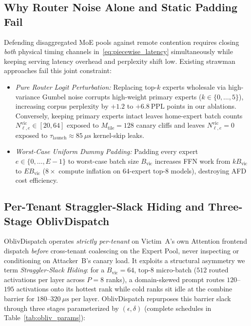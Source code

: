 \documentclass[final,5p,times,twocolumn]{elsarticle}
\def\OD{OblivDispatch}%
\theoremstyle{definition}
\theoremstyle{remark}
\newcommand{\OD}{\textsc{OblivDispatch}}
\begin{document}
\subsection{Why Router Noise Alone and Static Padding Fail}
Defending disaggregated MoE pools against remote contention requires closing \emph{both} physical timing channels in~\eqref{eq:piecewise_latency} simultaneously while keeping serving latency overhead and perplexity shift low. Existing strawman approaches fail this joint constraint:
\begin{itemize}
  \item \emph{Pure Router Logit Perturbation:} Replacing top-$k$ experts wholesale via high-variance Gumbel noise corrupts high-weight primary experts ($k \in \{0, \dots, 5\}$), increasing corpus perplexity by $+1.2$ to $+6.8~\mathrm{PPL}$ points in our ablations. Conversely, keeping primary experts intact leaves home-expert batch counts $N_{\ell, e}^{\mathrm{vic}} \in [20, 64]$ exposed to $M_{\mathrm{tile}} = 128$ canary cliffs and leaves $N_{\ell, e}^{\mathrm{vic}} = 0$ exposed to $\tau_{\mathrm{launch}} \approx 85~\mu\mathrm{s}$ kernel-skip leaks.
  \item \emph{Worst-Case Uniform Dummy Padding:} Padding every expert $e \in \{0, \dots, E-1\}$ to worst-case batch size $B_{\mathrm{vic}}$ increases FFN work from $k B_{\mathrm{vic}}$ to $E B_{\mathrm{vic}}$ ($8\times$ compute inflation on $64$-expert $\text{top-}8$ models), destroying AFD cost efficiency.
\end{itemize}

\subsection{Per-Tenant Straggler-Slack Hiding and Three-Stage OblivDispatch}
\OD{} operates \emph{strictly per-tenant} on Victim~A's own Attention frontend dispatch \emph{before} cross-tenant coalescing on the Expert Pool, never inspecting or conditioning on Attacker~B's canary load. It exploits a structural asymmetry we term \emph{Straggler-Slack Hiding}: for a $B_{\mathrm{vic}} = 64$, $\text{top-}8$ micro-batch ($512$ routed activations per layer across $P=8$ ranks), a domain-skewed prompt routes $120$--$195$ activations onto its hottest rank while cold ranks sit idle at the combine barrier for $180$--$320~\mu\mathrm{s}$ per layer. \OD{} repurposes this barrier slack through three stages parameterized by $(\epsilon, \delta)$ (complete schedules in Table~\ref{tab:obliv_params}):
\end{document}
